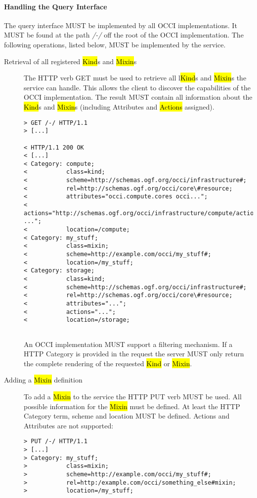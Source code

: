 \documentclass[10pt,a4paper]{article}
\begin{document}
\paragraph{Handling the Query Interface}
\label{sec:query}
The query interface MUST be implemented by all OCCI
implementations. It MUST be found at the path \emph{/-/} off the root
of the OCCI implementation. The following operations, listed below,
MUST be implemented by the service.

\begin{description}
\item[Retrieval of all registered \hl{Kind}s and \hl{Mixin}s] The HTTP
  verb GET must be used to retrieve all l\hl{Kind}s and \hl{Mixin}s the
  service can handle. This allows the client to discover the
  capabilities of the OCCI implementation. The result MUST contain all
  information about the \hl{Kind}s and \hl{Mixin}s (including
  Attributes and \hl{Actions} assigned).
\begin{verbatim}
> GET /-/ HTTP/1.1
> [...]
 
< HTTP/1.1 200 OK
< [...]
< Category: compute;
<           class=kind;
<           scheme=http://schemas.ogf.org/occi/infrastructure#;
<           rel=http://schemas.ogf.org/occi/core\#resource;
<           attributes="occi.compute.cores occi...";
<           actions="http://schemas.ogf.org/occi/infrastructure/compute/action#stop ...";
<           location=/compute;
< Category: my_stuff;
<           class=mixin;
<           scheme=http://example.com/occi/my_stuff#;
<           location=/my_stuff;
< Category: storage; 
<           class=kind;
<           scheme=http://schemas.ogf.org/occi/infrastructure#;
<           rel=http://schemas.ogf.org/occi/core\#resource;
<           attributes="...";
<           actions="...";
<           location=/storage;
 
\end{verbatim}
An OCCI implementation MUST support a filtering mechanism. If a HTTP
Category is provided in the request the server MUST only return the
complete rendering of the requested \hl{Kind} or \hl{Mixin}.

\item[Adding a \hl{Mixin} definition] To add a \hl{Mixin} to
  the service the HTTP PUT verb MUST be used. All possible information
  for the \hl{Mixin} must be defined. At least the HTTP Category term,
  scheme and location MUST be defined. Actions and Attributes are not
  supported:
\begin{verbatim}
> PUT /-/ HTTP/1.1
> [...]
> Category: my_stuff;
>           class=mixin;
>           scheme=http://example.com/occi/my_stuff#;
>           rel=http:/example.com/occi/something_else#mixin;
>           location=/my_stuff;


\end{verbatim}
\end{description}
\end{document}
